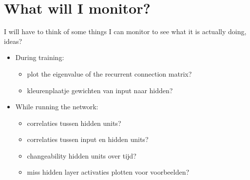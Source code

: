 \documentclass{article}
\begin{document}
% 
% 
% 
% 
% 


\section{What will I monitor?}

I will have to think of some things I can monitor to see what it is actually doing, ideas?\begin{itemize}
    \item During training:\begin{itemize}
            \item plot the eigenvalue of the recurrent connection matrix?
            \item kleurenplaatje gewichten van input naar hidden?
        \end{itemize}
    \item While running the network:\begin{itemize}
            \item correlaties tussen hidden units?
            \item correlaties tussen input en hidden units?
            \item changeability hidden units over tijd?
            \item miss hidden layer activaties plotten voor voorbeelden?
        \end{itemize}
    \end{itemize}
\end{document}
